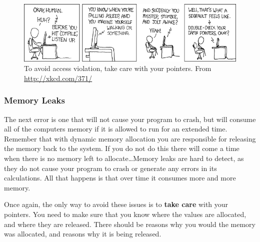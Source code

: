 \begin{figure}[h]
   \centering
   \includegraphics[width=\textwidth]{./topics/dynamic-memory/images/compiler_complaint} 
   \caption{To avoid access violation, take care with your pointers. From \url{http://xkcd.com/371/}}
   \label{fig:compiler-complaint}
\end{figure}


\clearpage
\subsubsection{Memory Leaks} %
\label{ssub:memory_leaks}

The next error is one that will not cause your program to crash, but will consume all of the computers memory if it is allowed to run for an extended time. Remember that with dynamic memory allocation you are responsible for releasing the memory back to the system. If you do not do this there will come a time when there is no memory left to allocate\ldots Memory leaks are hard to detect, as they do not cause your program to crash or generate any errors in its calculations. All that happens is that over time it consumes more and more memory.

Once again, the only way to avoid these issues is to \textbf{take care} with your pointers. You need to make sure that you know where the values are allocated, and where they are released. There should be reasons why you would the memory was allocated, and reasons why it is being released.


